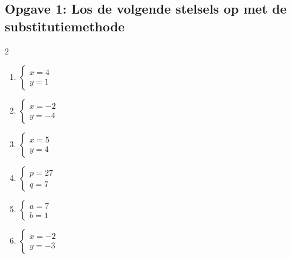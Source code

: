 \subsection*{Opgave 1: Los de volgende stelsels op met de substitutiemethode}
\begin{multicols}{2}
\begin{enumerate}[label=\alph*)]
    \item $\begin{cases} x = 4 \\ y = 1 \end{cases}$
    \item $\begin{cases} x = -2 \\ y = -4 \end{cases}$
    \item $\begin{cases} x = 5 \\ y = 4 \end{cases}$
    \item $\begin{cases} p = 27 \\ q = 7 \end{cases}$
    \item $\begin{cases} a = 7 \\ b = 1 \end{cases}$
    \item $\begin{cases} x = -2 \\ y = -3 \end{cases}$
\end{enumerate}
\end{multicols}

